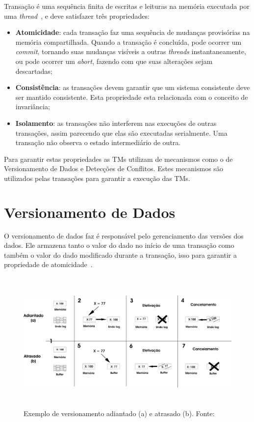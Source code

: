 \documentclass[diss,capa]{texufpel}
\begin{document}
Transação é uma sequência finita de escritas e leituras na memória executada por uma \emph{thread}~\cite{herlihy93}, e deve satisfazer três propriedades:

\begin{itemize}
 \item \textbf{Atomicidade}: cada transação faz uma sequência de mudanças provisórias na memória compartilhada. Quando a transação é concluída, pode ocorrer um \emph{commit}, tornando suas mudanças visíveis a outras \emph{threads} instantaneamente, ou pode ocorrer um \emph{abort}, fazendo com que suas alterações sejam descartadas;

 \item \textbf{Consistência}: as transações devem garantir que um sistema consistente deve ser mantido consistente. Esta propriedade esta relacionada com o conceito de invariância;

 \item \textbf{Isolamento}: as transações não interferem nas execuções de outras transações, assim parecendo que elas são executadas serialmente. Uma transação não observa o estado intermediário de outra.
\end{itemize}

Para garantir estas propriedades as TMs utilizam de mecanismos como o de Versionamento de Dados e Detecções de Conflitos. Estes mecanismos são utilizados pelas transações para garantir a execução das TMs.

\section{Versionamento de Dados}

O versionamento de dados faz é responsável pelo gerenciamento das versões dos dados. Ele armazena tanto o valor do dado no início de uma transação como também o valor do dado modificado durante a transação, isso para garantir a propriedade de atomicidade~\cite{BaldassinTese2009}.

\begin{figure}[!htp]
\centering
\includegraphics[height=7cm]{images/versionamento.png}
\caption{Exemplo de versionamento adiantado (a) e atrasado (b). Fonte:~\cite{BaldassinTese2009}}
\label{figuraversionamento}
\end{figure}
\end{document}
